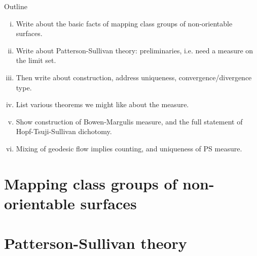 Outline
\begin{enumerate}[(i)]
\item Write about the basic facts of mapping class groups of non-orientable surfaces.
\item Write about Patterson-Sullivan theory: preliminaries, i.e. need a measure on the limit set.
\item Then write about construction, address uniqueness, convergence/divergence type.
\item List various theorems we might like about the measure.
\item Show construction of Bowen-Margulis measure, and the full statement of Hopf-Tsuji-Sullivan dichotomy.
\item Mixing of geodesic flow implies counting, and uniqueness of PS measure.
\end{enumerate}

\section{Mapping class groups of non-orientable surfaces}
\label{sec:mapping-class-groups}

\section{Patterson-Sullivan theory}
\label{sec:patt-sull-theory}



